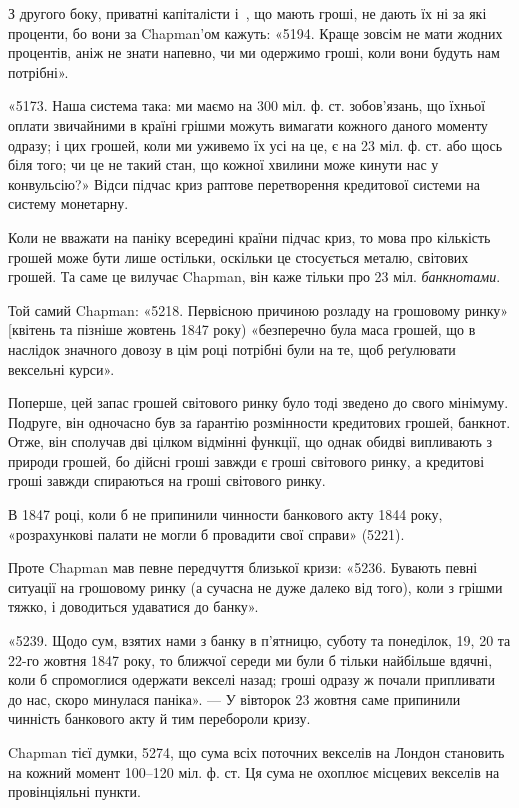 
З другого боку, приватні капіталісти і~, що мають гроші, не дають
їх ні за які проценти, бо вони за Chapman’ом кажуть: «5194. Краще зовсім не
мати жодних процентів, аніж не знати напевно, чи ми одержимо гроші, коли
вони будуть нам потрібні».

«5173. Наша система така: ми маємо на 300 міл. ф. ст. зобов’язань, що
їхньої оплати звичайними в країні грішми можуть вимагати кожного даного
моменту одразу; і цих грошей, коли ми уживемо їх усі на це, є на 23 міл.
ф. ст. або щось біля того; чи це не такий стан, що кожної хвилини може
кинути нас у конвульсію?» Відси підчас криз раптове перетворення кредитової
системи на систему монетарну.

Коли не вважати на паніку всередині країни підчас криз, то мова про
кількість грошей може бути лише остільки, оскільки це стосується металю, світових
грошей. Та саме це вилучає Chapman, він каже тільки про 23 міл.
\emph{банкнотами}.

Той самий Chapman: «5218. Первісною причиною розладу на грошовому
ринку» [квітень та пізніше жовтень 1847 року) «безперечно була маса грошей,
що в наслідок значного довозу в цім році потрібні були на те, щоб реґулювати
вексельні курси».

Поперше, цей запас грошей світового ринку було тоді зведено до свого
мінімуму. Подруге, він одночасно був за ґарантію розмінности кредитових грошей,
банкнот. Отже, він сполучав дві цілком відмінні функції, що однак обидві
випливають з природи грошей, бо дійсні гроші завжди є гроші світового ринку,
а кредитові гроші завжди спираються на гроші світового ринку.

В 1847 році, коли б не припинили чинности банкового акту 1844 року,
«розрахункові палати не могли б провадити свої справи» (5221).

Проте Chapman мав певне передчуття близької кризи: «5236. Бувають певні
ситуації на грошовому ринку (а сучасна не дуже далеко від того), коли з грішми
тяжко, і доводиться удаватися до банку».

«5239. Щодо сум, взятих нами з банку в п’ятницю, суботу та понеділок,
19, 20 та 22-го жовтня 1847 року, то ближчої середи ми були б тільки найбільше
вдячні, коли б спромоглися одержати векселі назад; гроші одразу ж
почали припливати до нас, скоро минулася паніка». — У вівторок 23 жовтня
саме припинили чинність банкового акту й тим перебороли кризу.

Chapman тієї думки, 5274, що сума всіх поточних векселів на Лондон
становить на кожний момент 100--120 міл. ф. ст. Ця сума не охоплює місцевих
векселів на провінціяльні пункти.

